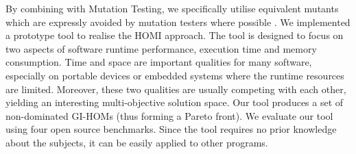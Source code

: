 \documentclass[oribibl]{llncs}
\begin{document}

By combining with Mutation Testing, we specifically utilise equivalent mutants which are expressly avoided by mutation testers where possible \cite{7194639}. 
We implemented a prototype tool to realise the HOMI approach. The tool is designed to focus on two aspects of software runtime performance, execution time and memory consumption. Time and space are important qualities for many software, especially on portable devices or embedded systems where the runtime resources are limited. Moreover, these two qualities are usually competing with each other, yielding an interesting multi-objective solution space. Our tool produces a set of non-dominated GI-HOMs (thus forming a Pareto front). We evaluate our tool using four open source benchmarks. Since the tool requires no prior knowledge about the subjects, it can be easily applied to other programs.
\end{document}
